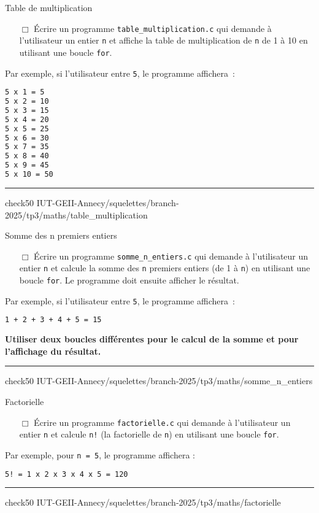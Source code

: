 
\begin{UPSTIManipulation}{Table de multiplication}
	\begin{itemize}
		\item[$\Box$] Écrire un programme \texttt{table\_multiplication.c} qui demande à l'utilisateur un entier \texttt{n} et affiche la table de multiplication de \texttt{n} de 1 à 10 en utilisant une boucle \texttt{for}.
	\end{itemize}
	Par exemple, si l'utilisateur entre \texttt{5}, le programme affichera :
	\begin{lstlisting}[language=bash,style=console]
5 x 1 = 5
5 x 2 = 10
5 x 3 = 15
5 x 4 = 20
5 x 5 = 25
5 x 6 = 30
5 x 7 = 35
5 x 8 = 40
5 x 9 = 45
5 x 10 = 50
\end{lstlisting}
	\hrule
	check50 IUT-GEII-Annecy/squelettes/branch-2025/tp3/maths/table\_multiplication
\end{UPSTIManipulation}

\begin{UPSTIManipulation}{Somme des n premiers entiers}
	\begin{itemize}
		\item[$\Box$] Écrire un programme \texttt{somme\_n\_entiers.c} qui demande à l'utilisateur un entier \texttt{n} et calcule la somme des \texttt{n} premiers entiers (de 1 à \texttt{n}) en utilisant une boucle \texttt{for}. Le programme doit ensuite afficher le résultat.
	\end{itemize}
	Par exemple, si l'utilisateur entre \texttt{5}, le programme affichera :
	\begin{lstlisting}[language=bash,style=console]
1 + 2 + 3 + 4 + 5 = 15
\end{lstlisting}
	\textbf{Utiliser deux boucles différentes pour le calcul de la somme et pour l'affichage du résultat.}
	\hrule
	check50 IUT-GEII-Annecy/squelettes/branch-2025/tp3/maths/somme\_n\_entiers
\end{UPSTIManipulation}

\begin{UPSTIManipulation}{Factorielle}
	\begin{itemize}
		\item[$\Box$] Écrire un programme \texttt{factorielle.c} qui demande à l’utilisateur un entier \texttt{n} et calcule \texttt{n!} (la factorielle de \texttt{n}) en utilisant une boucle \texttt{for}.
	\end{itemize}
	Par exemple, pour \texttt{n = 5}, le programme affichera :
	\begin{lstlisting}[language=bash,style=console]
5! = 1 x 2 x 3 x 4 x 5 = 120
\end{lstlisting}
	\hrule
	check50 IUT-GEII-Annecy/squelettes/branch-2025/tp3/maths/factorielle
\end{UPSTIManipulation}

